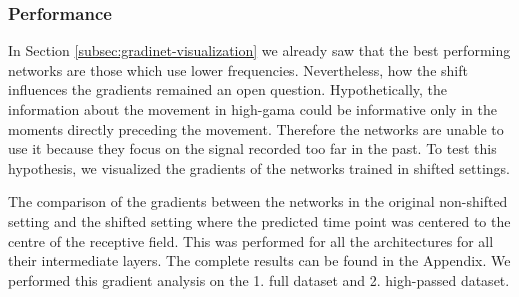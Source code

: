 \subsubsection{Performance}
In Section \ref{subsec:gradinet-visualization} we already saw that the best performing networks are those which use lower frequencies.
Nevertheless, how the shift influences the gradients remained an open question.
Hypothetically, the information about the movement in high-gama could be informative only in the moments directly preceding the movement.
Therefore the networks are unable to use it because they focus on the signal recorded too far in the past.
To test this hypothesis, we visualized the gradients of the networks trained in shifted settings.

The comparison of the gradients between the networks in the original non-shifted setting and the shifted setting where the predicted time point was centered to the centre of the receptive field.
This was performed for all the architectures for all their intermediate layers.
The complete results can be found in the Appendix.
We performed this gradient analysis on the 1. full dataset and 2. high-passed dataset.

